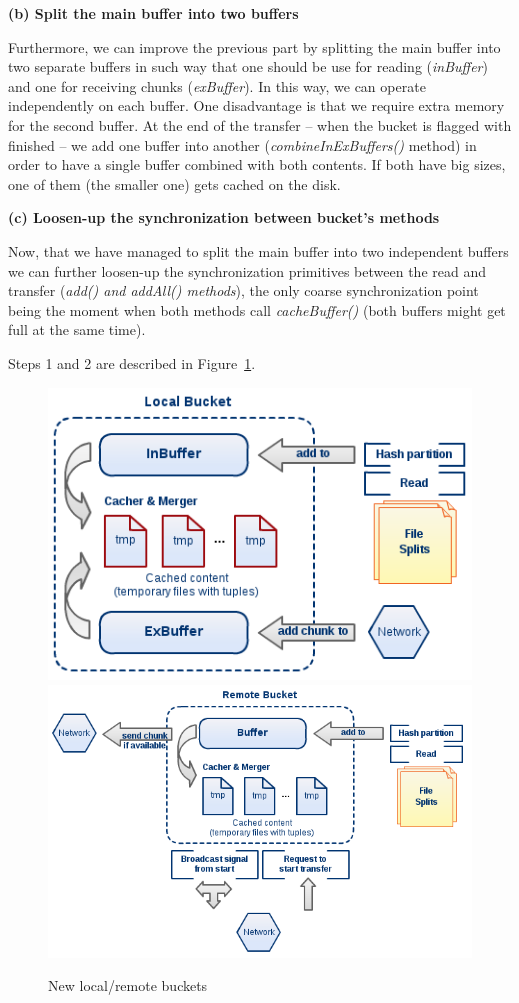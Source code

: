 \textbf{(b) Split the main buffer into two buffers}

Furthermore, we can improve the previous part by splitting the main buffer into two separate buffers in such way that one should be use for reading (\textit{inBuffer}) and one for receiving chunks (\textit{exBuffer}). In this way, we can operate independently on each buffer. One disadvantage is that we require extra memory for the second buffer. At the end of the transfer -- when the bucket is flagged with finished -- we add one buffer into another (\textit{combineInExBuffers()} method) in order to have a single buffer combined with both contents. If both have big sizes, one of them (the smaller one) gets cached on the disk.

\textbf{(c) Loosen-up the synchronization between bucket's methods}

Now, that we have managed to split the main buffer into two independent buffers we can further loosen-up the synchronization primitives between the read and transfer (\textit{add() and addAll() methods}), the only coarse synchronization point being the moment when both methods call \textit{cacheBuffer()} (both buffers might get full at the same time).

Steps 1 and 2 are described in Figure~\ref{fig:diag4}.

\pagebreak

\begin{figure}
\centering
\includegraphics[scale=0.6]{diag4a}
\linebreak
\linebreak
\centering
\includegraphics[scale=0.6]{diag4b}
\caption{New local/remote buckets}
\label{fig:diag4}
\end{figure}

